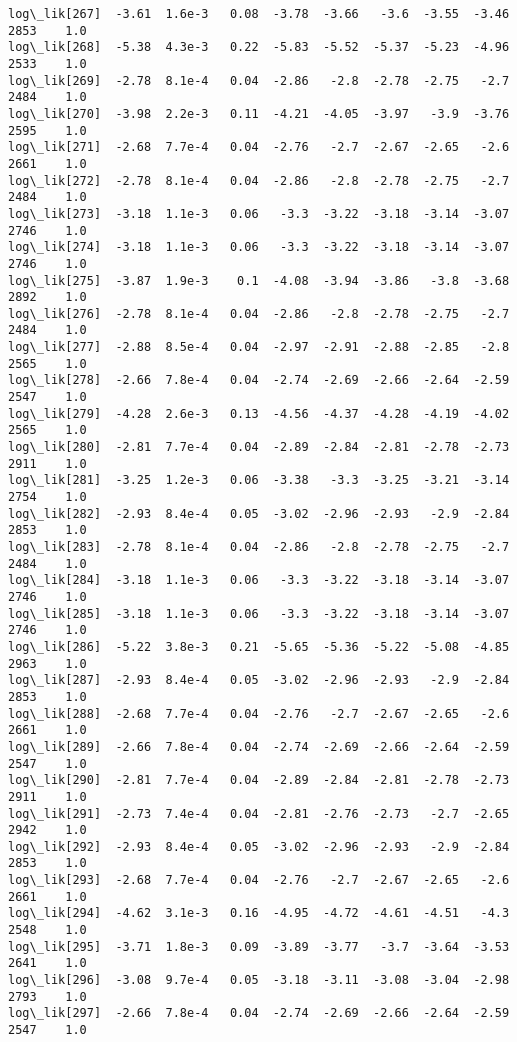 \documentclass[11pt]{article}
\begin{document}
\begin{Verbatim}[commandchars=\\\{\}]
log\_lik[267]  -3.61  1.6e-3   0.08  -3.78  -3.66   -3.6  -3.55  -3.46   2853    1.0
log\_lik[268]  -5.38  4.3e-3   0.22  -5.83  -5.52  -5.37  -5.23  -4.96   2533    1.0
log\_lik[269]  -2.78  8.1e-4   0.04  -2.86   -2.8  -2.78  -2.75   -2.7   2484    1.0
log\_lik[270]  -3.98  2.2e-3   0.11  -4.21  -4.05  -3.97   -3.9  -3.76   2595    1.0
log\_lik[271]  -2.68  7.7e-4   0.04  -2.76   -2.7  -2.67  -2.65   -2.6   2661    1.0
log\_lik[272]  -2.78  8.1e-4   0.04  -2.86   -2.8  -2.78  -2.75   -2.7   2484    1.0
log\_lik[273]  -3.18  1.1e-3   0.06   -3.3  -3.22  -3.18  -3.14  -3.07   2746    1.0
log\_lik[274]  -3.18  1.1e-3   0.06   -3.3  -3.22  -3.18  -3.14  -3.07   2746    1.0
log\_lik[275]  -3.87  1.9e-3    0.1  -4.08  -3.94  -3.86   -3.8  -3.68   2892    1.0
log\_lik[276]  -2.78  8.1e-4   0.04  -2.86   -2.8  -2.78  -2.75   -2.7   2484    1.0
log\_lik[277]  -2.88  8.5e-4   0.04  -2.97  -2.91  -2.88  -2.85   -2.8   2565    1.0
log\_lik[278]  -2.66  7.8e-4   0.04  -2.74  -2.69  -2.66  -2.64  -2.59   2547    1.0
log\_lik[279]  -4.28  2.6e-3   0.13  -4.56  -4.37  -4.28  -4.19  -4.02   2565    1.0
log\_lik[280]  -2.81  7.7e-4   0.04  -2.89  -2.84  -2.81  -2.78  -2.73   2911    1.0
log\_lik[281]  -3.25  1.2e-3   0.06  -3.38   -3.3  -3.25  -3.21  -3.14   2754    1.0
log\_lik[282]  -2.93  8.4e-4   0.05  -3.02  -2.96  -2.93   -2.9  -2.84   2853    1.0
log\_lik[283]  -2.78  8.1e-4   0.04  -2.86   -2.8  -2.78  -2.75   -2.7   2484    1.0
log\_lik[284]  -3.18  1.1e-3   0.06   -3.3  -3.22  -3.18  -3.14  -3.07   2746    1.0
log\_lik[285]  -3.18  1.1e-3   0.06   -3.3  -3.22  -3.18  -3.14  -3.07   2746    1.0
log\_lik[286]  -5.22  3.8e-3   0.21  -5.65  -5.36  -5.22  -5.08  -4.85   2963    1.0
log\_lik[287]  -2.93  8.4e-4   0.05  -3.02  -2.96  -2.93   -2.9  -2.84   2853    1.0
log\_lik[288]  -2.68  7.7e-4   0.04  -2.76   -2.7  -2.67  -2.65   -2.6   2661    1.0
log\_lik[289]  -2.66  7.8e-4   0.04  -2.74  -2.69  -2.66  -2.64  -2.59   2547    1.0
log\_lik[290]  -2.81  7.7e-4   0.04  -2.89  -2.84  -2.81  -2.78  -2.73   2911    1.0
log\_lik[291]  -2.73  7.4e-4   0.04  -2.81  -2.76  -2.73   -2.7  -2.65   2942    1.0
log\_lik[292]  -2.93  8.4e-4   0.05  -3.02  -2.96  -2.93   -2.9  -2.84   2853    1.0
log\_lik[293]  -2.68  7.7e-4   0.04  -2.76   -2.7  -2.67  -2.65   -2.6   2661    1.0
log\_lik[294]  -4.62  3.1e-3   0.16  -4.95  -4.72  -4.61  -4.51   -4.3   2548    1.0
log\_lik[295]  -3.71  1.8e-3   0.09  -3.89  -3.77   -3.7  -3.64  -3.53   2641    1.0
log\_lik[296]  -3.08  9.7e-4   0.05  -3.18  -3.11  -3.08  -3.04  -2.98   2793    1.0
log\_lik[297]  -2.66  7.8e-4   0.04  -2.74  -2.69  -2.66  -2.64  -2.59   2547    1.0

\end{Verbatim}
\end{document}
